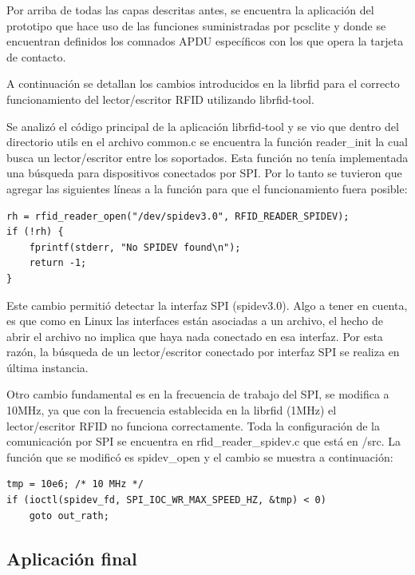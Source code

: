 \bigskip
{}
Por arriba de todas las capas descritas antes, se encuentra la aplicación del prototipo que hace uso de las funciones suministradas por pcsclite y donde se encuentran definidos los comnados APDU específicos con los que opera la tarjeta de contacto.


\bigskip
{}
A continuación se detallan los cambios introducidos en la librfid para el correcto funcionamiento del lector/escritor RFID utilizando librfid-tool.

\bigskip
Se analizó el código principal de la aplicación librfid-tool y se vio que dentro del directorio utils en el archivo common.c se encuentra la función reader\_init la cual busca un lector/escritor entre los soportados. Esta función no tenía implementada una búsqueda para dispositivos conectados por SPI. Por lo tanto se tuvieron que agregar las siguientes líneas a la función para que el funcionamiento fuera posible:

\begin{verbatim}
rh = rfid_reader_open("/dev/spidev3.0", RFID_READER_SPIDEV);
if (!rh) {
    fprintf(stderr, "No SPIDEV found\n");
    return -1;
}
\end{verbatim}

Este cambio permitió detectar la interfaz SPI (spidev3.0). Algo a tener en cuenta, es que como en Linux las interfaces están asociadas a un archivo, el hecho de abrir el archivo no implica que haya nada conectado en esa interfaz. Por esta razón, la búsqueda de un lector/escritor conectado por interfaz SPI se realiza en última instancia.

\bigskip
Otro cambio fundamental es en la frecuencia de trabajo del SPI, se modifica a 10MHz, ya que con la frecuencia establecida en la librfid (1MHz) el lector/escritor RFID no funciona correctamente. Toda la configuración de la comunicación por SPI se encuentra en rfid\_reader\_spidev.c que está en /src.
La función que se modificó es spidev\_open y el cambio se muestra a continuación:

\begin{verbatim}
tmp = 10e6; /* 10 MHz */
if (ioctl(spidev_fd, SPI_IOC_WR_MAX_SPEED_HZ, &tmp) < 0)
    goto out_rath;
\end{verbatim}

\subsection{Aplicación final}

